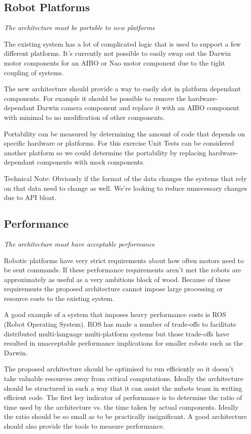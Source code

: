\documentclass[english,12pt]{scrartcl}
\newcommand{\requirement}[1]{\textit{#1}}
\begin{document}
		\subsection{Robot Platforms}
			\requirement{The architecture must be portable to new platforms}

			The existing system has a lot of complicated logic that is used to support a few
			different platforms. It's currently not possible to easily swap out the Darwin motor
			components for an AIBO or Nao motor component due to the tight coupling of systems.

			The new architecture should provide a way to easily slot in platform dependant
			components. For example it should be possible to remove the hardware-dependant Darwin
			camera component and replace it with an AIBO component with minimal to no modification
			of other components.

			Portability can be measured by determining the amount of code that depends on specific
			hardware or platforms. For this exercise Unit Tests can be considered another platform
			so we could determine the portability by replacing hardware-dependant components with
			mock components.

			Technical Note: Obviously if the format of the data changes the systems that rely on
			that data need to change as well. We're looking to reduce unnecessary changes due to API
			bloat.

		\subsection{Performance}
			\requirement{The architecture must have acceptable performance}

			Robotic platforms have very strict requirements about how often motors need to be sent
			commands. If these performance requirements aren't met the robots are approximately as
			useful as a very ambitious block of wood. Because of these requirements the proposed
			architecture cannot impose large processing or resource costs to the existing system.

			A good example of a system that imposes heavy performance costs is ROS (Robot Operating
			System). ROS has made a number of trade-offs to facilitate distributed multi-language
			multi-platform systems but those trade-offs have resulted in unacceptable performance
			implications for smaller robots such as the Darwin.

			The proposed architecture should be optimised to run efficiently so it doesn't take
			valuable resources away from critical computations. Ideally the architecture should be
			structured in such a way that it can assist the \gls{nubots} team in writing efficient code.
			The first key indicator of performance is to determine the ratio of time used by the
			architecture vs. the time taken by actual components. Ideally the ratio should be so
			small as to be practically insignificant. A good architecture should also provide the
			tools to measure performance.
\end{document}
